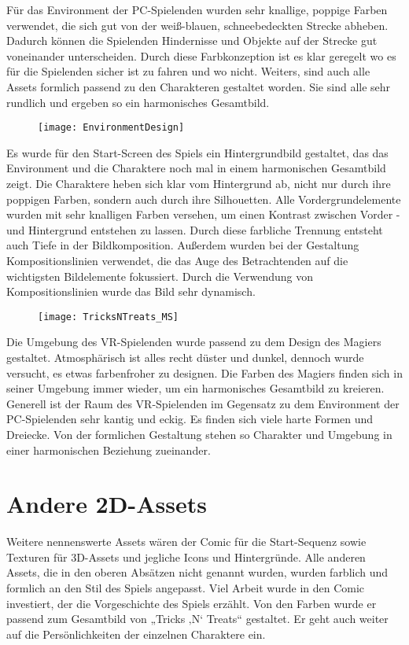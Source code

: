Für das Environment der PC-Spielenden wurden sehr knallige, poppige Farben verwendet, die sich gut von der weiß-blauen, schneebedeckten Strecke abheben. Dadurch können die Spielenden Hindernisse und Objekte auf der Strecke gut voneinander unterscheiden. Durch diese Farbkonzeption ist es klar geregelt wo es für die Spielenden sicher ist zu fahren und wo nicht. Weiters, sind auch alle Assets formlich passend zu den Charakteren gestaltet worden. Sie sind alle sehr rundlich und ergeben so ein harmonisches Gesamtbild.

\begin{figure}[H]
	\centering
	\texttt{[image: EnvironmentDesign]}
\end{figure}

Es wurde für den Start-Screen des Spiels ein Hintergrundbild gestaltet, das das Environment und die Charaktere noch mal in einem harmonischen Gesamtbild zeigt. Die Charaktere heben sich klar vom Hintergrund ab, nicht nur durch ihre poppigen Farben, sondern auch durch ihre Silhouetten. Alle Vordergrundelemente wurden mit sehr knalligen Farben versehen, um einen Kontrast zwischen Vorder -und Hintergrund entstehen zu lassen. Durch diese farbliche Trennung entsteht auch Tiefe in der Bildkomposition. Außerdem wurden bei der Gestaltung Kompositionslinien verwendet, die das Auge des Betrachtenden auf die wichtigsten Bildelemente fokussiert. Durch die Verwendung von Kompositionslinien wurde das Bild sehr dynamisch.

\begin{figure}[H]
	\centering
	\texttt{[image: TricksNTreats\_MS]}
\end{figure}

Die Umgebung des VR-Spielenden wurde passend zu dem Design des Magiers gestaltet. Atmosphärisch ist alles recht düster und dunkel, dennoch wurde versucht, es etwas farbenfroher zu designen. Die Farben des Magiers finden sich in seiner Umgebung immer wieder, um ein harmonisches Gesamtbild zu kreieren. Generell ist der Raum des VR-Spielenden im Gegensatz zu dem Environment der PC-Spielenden sehr kantig und eckig. Es finden sich viele harte Formen und Dreiecke. Von der formlichen Gestaltung stehen so Charakter und Umgebung in einer harmonischen Beziehung zueinander.

\section{Andere 2D-Assets}
Weitere nennenswerte Assets wären der Comic für die Start-Sequenz sowie Texturen für 3D-Assets und jegliche Icons und Hintergründe. Alle anderen Assets, die in den oberen Absätzen nicht genannt wurden, wurden farblich und formlich an den Stil des Spiels angepasst. 
Viel Arbeit wurde in den Comic investiert, der die Vorgeschichte des Spiels erzählt. Von den Farben wurde er passend zum Gesamtbild von „Tricks ‚N‘ Treats“ gestaltet. Er geht auch weiter auf die Persönlichkeiten der einzelnen Charaktere ein.


